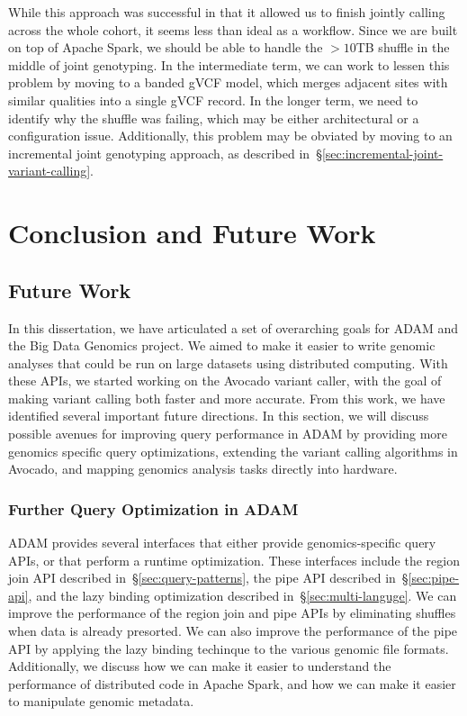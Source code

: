 \documentclass[phd]{ucbthesis}
\begin{document}
While this approach was successful in that it allowed us to finish jointly
calling across the whole cohort, it seems less than ideal as a workflow. Since
we are built on top of Apache Spark, we should be able to handle the $>10$TB
shuffle in the middle of joint genotyping. In the intermediate term, we can work
to lessen this problem by moving to a banded gVCF model, which merges adjacent
sites with similar qualities into a single gVCF record. In the longer term, we
need to identify why the shuffle was failing, which may be either architectural
or a configuration issue. Additionally, this problem may be obviated by moving
to an incremental joint genotyping approach, as described
in~\S\ref{sec:incremental-joint-variant-calling}.

\part{Conclusion and Future Work}

\chapter{Future Work}
\label{chap:future-work}

In this dissertation, we have articulated a set of overarching goals for
{ADAM} and the {Big Data Genomics} project. We aimed to make it
easier to write genomic analyses that could be run on large datasets using
distributed computing. With these APIs, we started working on the
{Avocado} variant caller, with the goal of making variant calling both
faster and more accurate. From this work, we have identified several important
future directions. In this section, we will discuss possible avenues for
improving query performance in {ADAM} by providing more genomics specific
query optimizations, extending the variant calling algorithms in
{Avocado}, and mapping genomics analysis tasks directly into hardware.

\section{Further Query Optimization in {ADAM}}
\label{sec:extensions-adam}

{ADAM} provides several interfaces that either provide genomics-specific
query APIs, or that perform a runtime optimization. These interfaces include the
region join API described in~\S\ref{sec:query-patterns}, the {pipe} API
described in~\S\ref{sec:pipe-api}, and the lazy binding optimization described
in~\S\ref{sec:multi-languge}. We can improve the performance of the region join
and {pipe} APIs by eliminating shuffles when data is already presorted.
We can also improve the performance of the {pipe} API by applying the
lazy binding techinque to the various genomic file formats. Additionally, we
discuss how we can make it easier to understand the performance of distributed
code in {Apache Spark}, and how we can make it easier to manipulate
genomic metadata.
\end{document}
